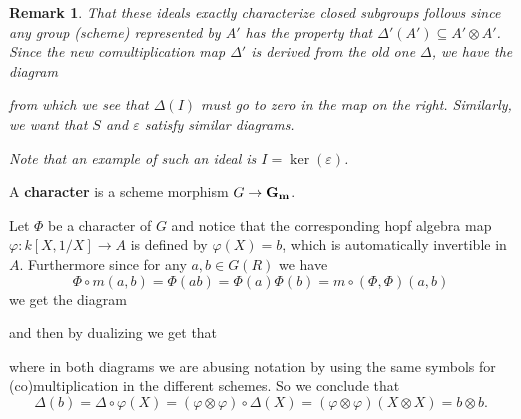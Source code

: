 \documentclass[12pt]{article}
\theoremstyle{nonumberbreak}
\theoremstyle{changebreak}
\theoremstyle{nonumberplain}
\theoremstyle{change}
\newtheorem{rmk}[thm]{Remark}
\newcommand*{\Gm}{\ensuremath\mathbf{G_m}}
\begin{document}
\begin{rmk}
	That these ideals exactly characterize closed subgroups follows since any group (scheme) represented
	by $A'$ has the property that $\Delta'(A')\subseteq A'\otimes A'$. Since the new comultiplication map
	$\Delta'$ is derived from the old one $\Delta$, we have the diagram
	\begin{figure}[h]
	\end{figure}
	
	\noindent from which we see that $\Delta(I)$ must go to zero in the map on the right.
	Similarly, we want that $S$ and $\varepsilon$ satisfy similar diagrams.

	Note that an example of such an ideal is $I=\ker(\varepsilon)$.
\end{rmk}

\begin{defn}
	A \textbf{character} is a scheme morphism $G\to \Gm$.
\end{defn}

Let $\Phi$ be a character of $G$ and notice that the corresponding hopf algebra map 
$\varphi:k[X,1/X]\to A$ is defined by $\varphi(X)=b$, which
is automatically invertible in $A$. Furthermore since for any $a,b\in G(R)$ we have
\[\Phi\circ m(a,b)=\Phi(ab)=\Phi(a)\Phi(b)=m\circ(\Phi,\Phi)(a,b)\]
we get the diagram
\begin{figure}[h]
\end{figure}

\noindent and then by dualizing we get that
\newpage
\begin{figure}[h]
\end{figure}

\noindent where in both diagrams we are abusing notation by using the same symbols for 
(co)multiplication in the different schemes. So we conclude that 
\[\Delta(b)=\Delta\circ\varphi(X)=(\varphi\otimes\varphi)\circ \Delta(X)=(\varphi\otimes\varphi)(X\otimes X)=b\otimes b.\]
\end{document}
